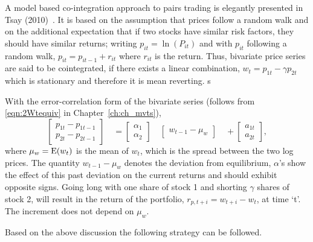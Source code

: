 A model based co-integration approach to pairs trading is elegantly presented in Tsay (2010)~\cite[Section 8-8]{tsay}. It is based on the assumption that prices follow a random walk and on the additional expectation that if two stocks have similar risk factors, they should have similar returns; writing $p_{it} = \ln(P_{it})$ and with $p_{it}$ following a random walk, $p_{it} = p_{it-1} + r_{it}$ where $r_{it}$ is the return. Thus, bivariate price series are said to be cointegrated, if there exists a linear combination, $w_t = p_{1t} - \gamma p_{2t}$ which is stationary and therefore it is mean reverting.
s

With the error-correlation form of the bivariate series (follows from \eqref{eqn:2Wtequiv} in Chapter~\ref{ch:ch_mvts}),
	\begin{equation} \label{eqn:errorbivar}
	\begin{bmatrix}
	p_{1t} - p_{1t-1} \\
	p_{2t} - p_{2t-1}
	\end{bmatrix}\quad
	= \begin{bmatrix} 
	\alpha_1\\ \alpha_2 
	\end{bmatrix}\quad 
	\begin{bmatrix} 
	w_{t-1} - \mu_{w}
	\end{bmatrix}\quad + 
	\begin{bmatrix} 
	a_{1t} \\ a_{2t} 
	\end{bmatrix},
	\end{equation}
where $\mu_w = \operatorname{E}(w_t)$ is the mean of $w_t$, which is the spread between the two log prices. The quantity $w_{t-1} - \mu_w$ denotes the deviation from equilibrium, $\alpha$'s show the effect of this past deviation on the current returns and should exhibit opposite signs. Going long with one share of stock 1 and shorting $\gamma$ shares of stock 2, will result in the return of the portfolio, $r_{p,t+i} = w_{t+i} - w_t$, at time `t'. The increment does not depend on $\mu_w$.


Based on the above discussion the following strategy can be followed. \medbreak

\begin{center}
\end{center} \twomedskip


